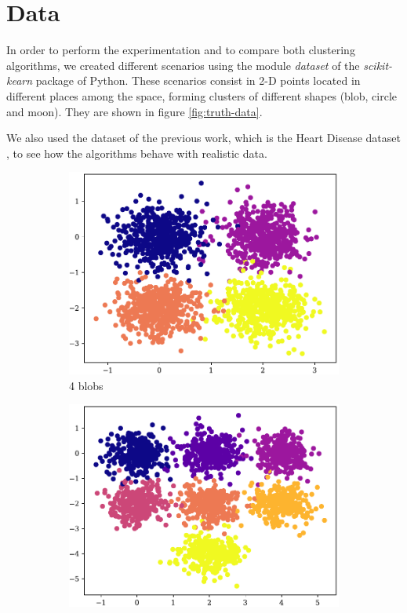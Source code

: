 \section{Data}
In order to perform the experimentation and to compare both clustering algorithms, we created different scenarios using the module \textit{dataset} of the \textit{scikit-kearn} \cite{scikit-learn} package of Python. These scenarios consist in 2-D points located in different places among the space, forming clusters of different shapes (blob, circle and moon). They are shown in figure \ref{fig:truth-data}. 

We also used the dataset of the previous work, which is the Heart Disease dataset \cite{heart}, to see how the algorithms behave with realistic data.

\begin{figure}[hbtp]
    \begin{subfigure}[b]{0.45\columnwidth}
        \includegraphics[width=\columnwidth]{../plots/truth_4-4.pdf}
        \caption{4 blobs}
        \label{subfig:4-4-truth}
    \end{subfigure}
    \hspace{0.04\columnwidth}
    \begin{subfigure}[b]{0.45\columnwidth}
        \includegraphics[width=\columnwidth]{../plots/truth_7-3.pdf}

\end{subfigure}
\end{figure}
